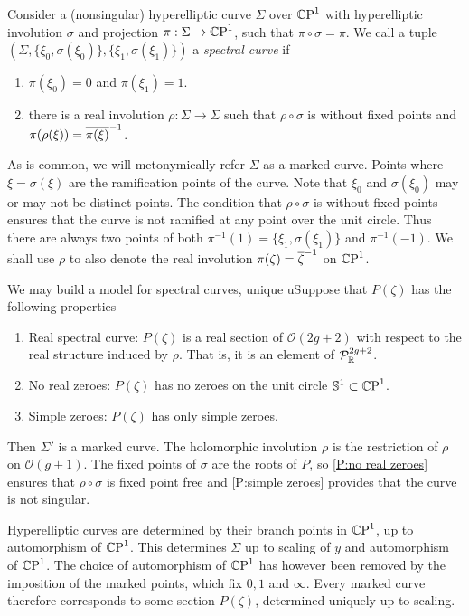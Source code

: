 \documentclass{article}
\begin{document}
\begin{defn}
\label{def:marked curve}
Consider a (nonsingular) hyperelliptic curve $\Sigma$ over $\mathbb{C}\text{P}^1$ with hyperelliptic involution $\sigma$ and projection $\pi:\Sigma\to\mathbb{C}\text{P}^1$, such that $\pi\circ \sigma = \pi$. We call a tuple $(\Sigma,\{ \xi_0, \sigma(\xi_0) \}, \{ \xi_1, \sigma(\xi_1) \})$ a \emph{spectral curve} if
\begin{enumerate}[label=(P.\arabic*)]
    \item\label{P:marked points} $\pi(\xi_0) = 0$ and $\pi(\xi_1) = 1$.
    \item\label{P:real involution} there is a real involution $\rho: \Sigma \to \Sigma$ such that $\rho\circ \sigma$ is without fixed points and $\pi(\rho(\xi)) = \overline{\pi(\xi)}^{-1}$.
\end{enumerate}
\end{defn}
As is common, we will metonymically refer $\Sigma$ as a marked curve.
Points where $\xi = \sigma(\xi)$ are the ramification points of the curve.
Note that $\xi_0$ and $\sigma(\xi_0)$ may or may not be distinct points. The condition that $\rho\circ \sigma$ is without fixed points ensures that the curve is not ramified at any point over the unit circle. Thus there are always two points of both $\pi^{-1}(1) = \{ \xi_1, \sigma(\xi_1) \}$ and $\pi^{-1}(-1)$. We shall use $\rho$ to also denote the real involution $\pi(\zeta) = \overline{\zeta}^{-1}$ on $\mathbb{C}\text{P}^1$.

We may build a model for spectral curves, unique uSuppose that $P(\zeta)$ has the following properties
\begin{enumerate}[label=(P.\arabic*)]
\item\label{P:real curve} Real spectral curve: $P(\zeta)$ is a real section of $\mathcal{O}(2g+2)$ with respect to the real structure induced by $\rho$. That is, it is an element of $\mathcal{P}^{2g+2}_{\mathbb{R}}$.
\item\label{P:no real zeroes} No real zeroes: $P(\zeta)$ has no zeroes on the unit circle $\mathbb{S}^1\subset\mathbb{C}\text{P}^1$.
\item\label{P:simple zeroes} Simple zeroes: $P(\zeta)$ has only simple zeroes.
\end{enumerate}
Then $\Sigma'$ is a marked curve. The holomorphic involution $\rho$ is the restriction of $\rho$ on $\mathcal{O}(g+1)$. The fixed points of $\sigma$ are the roots of $P$, so \ref{P:no real zeroes} ensures that $\rho\circ \sigma$ is fixed point free and \ref{P:simple zeroes} provides that the curve is not singular.

Hyperelliptic curves are determined by their branch points in $\mathbb{C}\text{P}^1$, up to automorphism of $\mathbb{C}\text{P}^1$. This determines $\Sigma$ up to scaling of $y$ and automorphism of $\mathbb{C}\text{P}^1$. The choice of automorphism of $\mathbb{C}\text{P}^1$ has however been removed by the imposition of the marked points, which fix $0,1$ and $\infty$. Every marked curve therefore corresponds to some section $P(\zeta)$, determined uniquely up to scaling.
\end{document}
